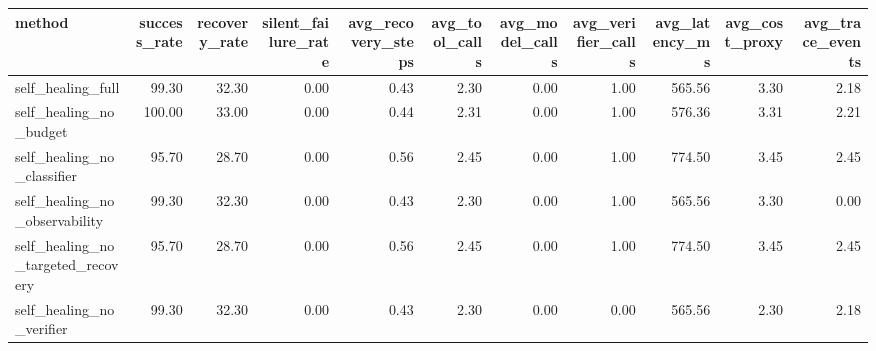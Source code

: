 \begin{tabular}{lrrrrrrrrrr}
\toprule
method & success_rate & recovery_rate & silent_failure_rate & avg_recovery_steps & avg_tool_calls & avg_model_calls & avg_verifier_calls & avg_latency_ms & avg_cost_proxy & avg_trace_events \\
\midrule
self_healing_full & 99.30 & 32.30 & 0.00 & 0.43 & 2.30 & 0.00 & 1.00 & 565.56 & 3.30 & 2.18 \\
self_healing_no_budget & 100.00 & 33.00 & 0.00 & 0.44 & 2.31 & 0.00 & 1.00 & 576.36 & 3.31 & 2.21 \\
self_healing_no_classifier & 95.70 & 28.70 & 0.00 & 0.56 & 2.45 & 0.00 & 1.00 & 774.50 & 3.45 & 2.45 \\
self_healing_no_observability & 99.30 & 32.30 & 0.00 & 0.43 & 2.30 & 0.00 & 1.00 & 565.56 & 3.30 & 0.00 \\
self_healing_no_targeted_recovery & 95.70 & 28.70 & 0.00 & 0.56 & 2.45 & 0.00 & 1.00 & 774.50 & 3.45 & 2.45 \\
self_healing_no_verifier & 99.30 & 32.30 & 0.00 & 0.43 & 2.30 & 0.00 & 0.00 & 565.56 & 2.30 & 2.18 \\
\bottomrule
\end{tabular}
